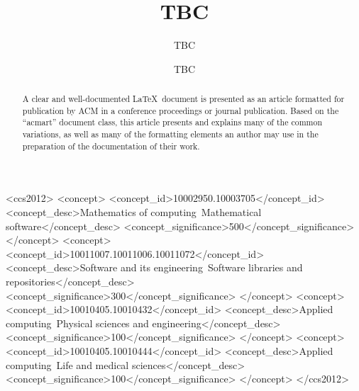 \documentclass[acmsmall]{acmart}
\begin{document}
\title{TBC}

\author{TBC}
\author{TBC}
\correspondingauthor
\authornotemark[1]

\renewcommand{\shortauthors}{TBC et al.}

\begin{abstract}
  A clear and well-documented \LaTeX\ document is presented as an
  article formatted for publication by ACM in a conference proceedings
  or journal publication. Based on the ``acmart'' document class, this
  article presents and explains many of the common variations, as well
  as many of the formatting elements an author may use in the
  preparation of the documentation of their work.
\end{abstract}

\begin{CCSXML}
<ccs2012>
   <concept>
       <concept_id>10002950.10003705</concept_id>
       <concept_desc>Mathematics of computing~Mathematical software</concept_desc>
       <concept_significance>500</concept_significance>
       </concept>
   <concept>
       <concept_id>10011007.10011006.10011072</concept_id>
       <concept_desc>Software and its engineering~Software libraries and repositories</concept_desc>
       <concept_significance>300</concept_significance>
       </concept>
   <concept>
       <concept_id>10010405.10010432</concept_id>
       <concept_desc>Applied computing~Physical sciences and engineering</concept_desc>
       <concept_significance>100</concept_significance>
       </concept>
   <concept>
       <concept_id>10010405.10010444</concept_id>
       <concept_desc>Applied computing~Life and medical sciences</concept_desc>
       <concept_significance>100</concept_significance>
       </concept>
 </ccs2012>
\end{CCSXML}



\end{document}
